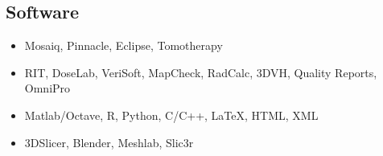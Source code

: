 \documentclass[margin]{res}
\begin{document}
\begin{resume}
\section{Software}
\begin{itemize}[noitemsep]
    \item Mosaiq, Pinnacle, Eclipse, Tomotherapy
    \item RIT, DoseLab, VeriSoft, MapCheck, RadCalc, 3DVH, Quality Reports, OmniPro
    \item Matlab/Octave, R, Python, C/C++, LaTeX, HTML, XML
    \item 3DSlicer, Blender, Meshlab, Slic3r
\end{itemize}
 
 

\end{resume}
\end{document}
